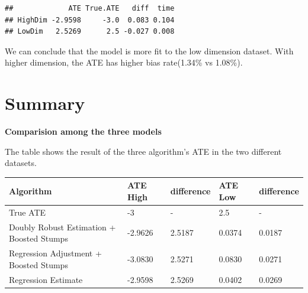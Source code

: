 \documentclass[]{article}
\newenvironment{Shaded}{\begin{snugshade}}{\end{snugshade}}
\newcommand{\DataTypeTok}[1]{\textcolor[rgb]{0.13,0.29,0.53}{#1}}
\newcommand{\DecValTok}[1]{\textcolor[rgb]{0.00,0.00,0.81}{#1}}
\newcommand{\KeywordTok}[1]{\textcolor[rgb]{0.13,0.29,0.53}{\textbf{#1}}}
\newcommand{\NormalTok}[1]{#1}
\newcommand{\OperatorTok}[1]{\textcolor[rgb]{0.81,0.36,0.00}{\textbf{#1}}}
\newcommand{\StringTok}[1]{\textcolor[rgb]{0.31,0.60,0.02}{#1}}
\begin{document}
\begin{Shaded}
\end{Shaded}

\begin{verbatim}
##             ATE True.ATE   diff  time
## HighDim -2.9598     -3.0  0.083 0.104
## LowDim   2.5269      2.5 -0.027 0.008
\end{verbatim}

We can conclude that the model is more fit to the low dimension dataset.
With higher dimension, the ATE has higher bias rate(1.34\% vs 1.08\%).

\hypertarget{summary}{%
\section{Summary}\label{summary}}

\textbf{Comparision among the three models}

The table shows the result of the three algorithm's ATE in the two
different datasets.

\begin{longtable}[]{@{}lllll@{}}
\toprule
Algorithm & \textbf{ATE High} & difference & \textbf{ATE Low} &
difference\tabularnewline
\midrule
\endhead
True ATE & -3 & - & 2.5 & -\tabularnewline
Doubly Robust Estimation + Boosted Stumps & -2.9626 & 2.5187 & 0.0374 &
0.0187\tabularnewline
Regression Adjustment + Boosted Stumps & -3.0830 & 2.5271 & 0.0830 &
0.0271\tabularnewline
Regression Estimate & -2.9598 & 2.5269 & 0.0402 & 0.0269\tabularnewline
\bottomrule
\end{longtable}
\end{document}
